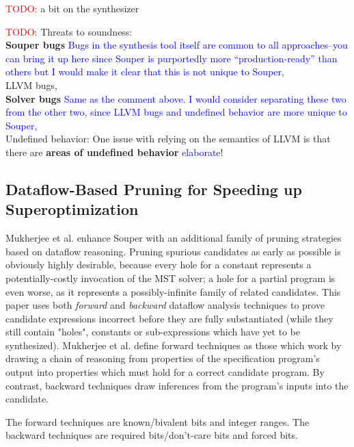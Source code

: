 \documentclass[12pt,twoside]{reedthesis}
\newcommand{\red}[1]{\textcolor{red}{#1}}
\newcommand{\comment}[2]{\textbf{#1} \textcolor{blue}{#2}}
\begin{document}
            
            \red{TODO:} a bit on the synthesizer
            
            \red{TODO}: Threats to soundness:
            \\ \comment{Souper bugs}{Bugs in the synthesis tool itself are common to all approaches--you can bring it up here since Souper is purportedly more ``production-ready'' than others but I would make it clear that this is not unique to Souper},
            \\ LLVM bugs,
            \\ \comment{Solver bugs}{Same as the comment above. I would consider separating these two from the other two, since LLVM bugs and undefined behavior are more unique to Souper},
            \\ Undefined behavior: One issue with relying on the semantics of LLVM is that there are \comment{areas of undefined behavior}{elaborate}!

        \subsection{Dataflow-Based Pruning for Speeding up Superoptimization}
            Mukherjee et al. \cite{mukherjee2020dataflow} enhance Souper with an additional family of pruning strategies based on dataflow reasoning. 
            Pruning spurious candidates as early as possible is obviously highly desirable, because every hole for a constant represents a potentially-costly invocation of the MST solver; a hole for a partial program is even worse, as it represents a possibly-infinite family of related candidates.
            This paper uses both \textit{forward} and \textit{backward} dataflow analysis techniques to prove candidate expressions incorrect before they are fully substantiated (while they still contain "holes", constants or sub-expressions which have yet to be synthesized).
            Mukherjee et al. define forward techniques as those which work by drawing a chain of reasoning from properties of the specification program's output into properties which must hold for a correct candidate program.
            By contrast, backward techniques draw inferences from the program's inputs into the candidate.
            
            The forward techniques are known/bivalent bits and integer ranges.
            The backward techniques are required bits/don't-care bits and forced bits.
            
\end{document}
